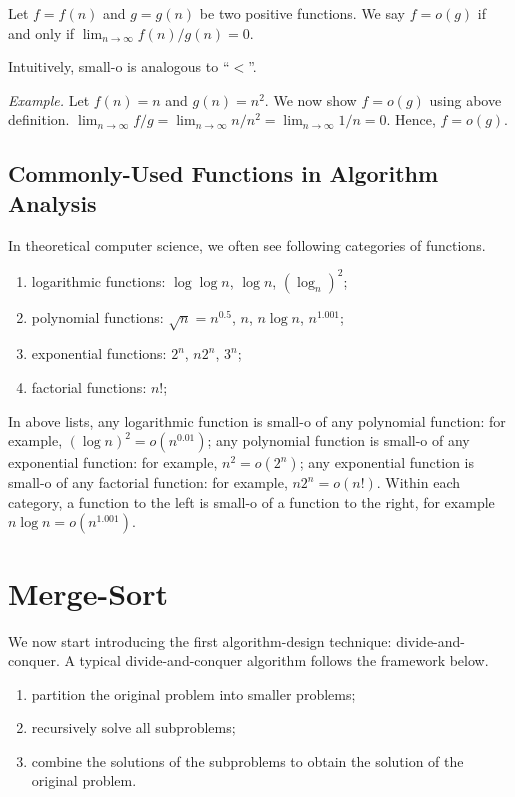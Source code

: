 \begin{definition}[small-o]
Let $f = f(n)$ and $g = g(n)$ be two positive functions. We say $f = o(g)$ if and only if $\lim_{n\to\infty} f(n) / g(n) = 0$.
\end{definition}

Intuitively, small-o is analogous to ``$<$''.

\emph{Example.} Let $f(n) = n$ and $g(n) = n^2$. We now show $f = o(g)$ using above definition.
$\lim_{n\to\infty} f / g = \lim_{n\to\infty} n/n^2 = \lim_{n\to\infty} 1 / n = 0$.
Hence, $f = o(g)$.


\subsection*{Commonly-Used Functions in Algorithm Analysis}

In theoretical computer science, we often see following categories of functions.
\vspace*{-\topsep}
\begin{enumerate}
\item logarithmic functions: $\log\log n$, $\log n$, $(\log_n)^2$;
\item polynomial functions: $\sqrt{n} = n^{0.5}$, $n$, $n\log n$, $n^{1.001}$;
\item exponential functions: $2^n$, $n2^n$, $3^n$;
\item factorial functions: $n!$;
\end{enumerate}

In above lists, any logarithmic function is small-o of any polynomial function: for example, $(\log n)^2 = o(n^{0.01})$;
any polynomial function is small-o of any exponential function: for example, $n^2 = o(2^n)$;
any exponential function is small-o of any factorial function: for example, $n2^n = o(n!)$.
Within each category, a function to the left is small-o of a function to the right, for example $n\log n = o(n^{1.001})$.

\section*{Merge-Sort}

We now start introducing the first algorithm-design technique:
divide-and-conquer. 
A typical divide-and-conquer algorithm follows the framework below.
\vspace*{-\topsep}
\begin{enumerate}
\item partition the original problem into smaller problems;
\item recursively solve all subproblems;
\item combine the solutions of the subproblems to obtain the solution of the original problem.
\end{enumerate}

